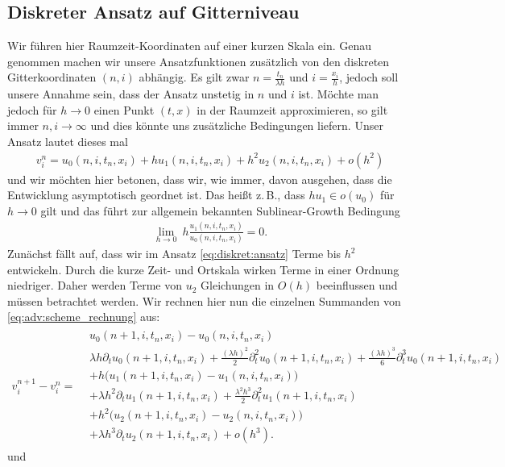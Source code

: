 \subsection {Diskreter Ansatz auf Gitterniveau} \label{sec:diskret}

Wir führen hier Raumzeit-Koordinaten auf einer kurzen Skala ein.
Genau genommen machen wir unsere Ansatzfunktionen zusätzlich von den diskreten Gitterkoordinaten $(n,i)$ abhängig.
Es gilt zwar $n = \frac {t_n} {\lambda h}$ und $i = \frac {x_i}{h}$, jedoch soll unsere Annahme sein, dass der Ansatz unstetig in $n$ und $i$ ist.
Möchte man jedoch für $h \to 0$ einen Punkt $(t,x)$ in der Raumzeit approximieren, so gilt immer $n,i \to \infty$ und dies könnte uns zusätzliche Bedingungen liefern.
Unser Ansatz lautet dieses mal
\begin{align}\label{eq:diskret:ansatz}
v^n_i = u_0(n, i, t_n, x_i) + h u_1(n, i, t_n, x_i) + h^2 u_2(n, i, t_n, x_i) + o(h^2)
\end{align}
und wir möchten hier betonen, dass wir, wie immer, davon ausgehen, dass die Entwicklung asymptotisch geordnet ist.
Das heißt z.\,B., dass $h u_1 \in o(u_0)$ für $h \to 0$ gilt und das führt zur allgemein bekannten Sublinear-Growth Bedingung
\begin{align}\label{eq:diskret:sublineargrowth}
\lim_{h \to 0} \: h \frac{u_1(n, i, t_n, x_i)}{u_0(n, i, t_n, x_i)} = 0.
\end{align}
Zunächst fällt auf, dass wir im Ansatz \eqref{eq:diskret:ansatz} Terme bis $h^2$ entwickeln.
Durch die kurze Zeit- und Ortskala wirken Terme in einer Ordnung niedriger.
Daher werden Terme von $u_2$ Gleichungen in $O(h)$ beeinflussen und müssen betrachtet werden.
Wir rechnen hier nun die einzelnen Summanden von \eqref{eq:adv:scheme_rechnung} aus:
{
\begin{align} \label{eq:diskret:diff1}
v^{n+1}_i - v^n_i =
\begin{split}
& u_0(n+1, i, t_n, x_i) - u_0(n, i, t_n, x_i)\\
&\lambda h \partial_t u_0(n+1, i, t_n, x_i) + \frac {(\lambda h)^2}{2} \partial^2_t u_0(n+1, i, t_n, x_i) + \frac {(\lambda h)^3}{6} \partial^3_t u_0(n+1, i, t_n, x_i)\\
&+ h \bigl( u_1(n+1, i, t_n, x_i) - u_1(n, i, t_n, x_i) \bigr)\\
&+ \lambda h^2 \partial_t u_1(n+1, i, t_n, x_i) + \frac {\lambda^2 h^3}{2} \partial^2_t u_1(n+1, i, t_n, x_i)\\
&+ h^2 \bigl( u_2(n+1, i, t_n, x_i) - u_2(n, i, t_n, x_i) \bigr)\\
&+ \lambda h^3 \partial_t u_2(n+1, i, t_n, x_i) + o(h^3).
\end{split}
\end{align}
} und

